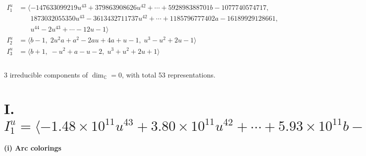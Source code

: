\documentclass[1p]{elsarticle_modified}
\theoremstyle{definition}
\begin{document}
\begin{align*}
I^u_{1}&=\langle 
-147633099219 u^{43}+379863908626 u^{42}+\cdots+592898388701 b-1077740574717,\\
\phantom{I^u_{1}}&\phantom{= \langle  }1873032055350 u^{43}-3613432711737 u^{42}+\cdots+1185796777402 a-16189929128661,\\
\phantom{I^u_{1}}&\phantom{= \langle  }u^{44}-2 u^{43}+\cdots-12 u-1\rangle \\
I^u_{2}&=\langle 
b-1,\;2 u^2 a+a^2-2 a u+4 a+u-1,\;u^3- u^2+2 u-1\rangle \\
I^u_{3}&=\langle 
b+1,\;- u^2+a- u-2,\;u^3+u^2+2 u+1\rangle \\
\\
\end{align*}
\raggedright * 3 irreducible components of $\dim_{\mathbb{C}}=0$, with total 53 representations.\\
\newpage
\renewcommand{\arraystretch}{1}
\centering \section*{I. $I^u_{1}= \langle -1.48\times10^{11} u^{43}+3.80\times10^{11} u^{42}+\cdots+5.93\times10^{11} b-1.08\times10^{12},\;1.87\times10^{12} u^{43}-3.61\times10^{12} u^{42}+\cdots+1.19\times10^{12} a-1.62\times10^{13},\;u^{44}-2 u^{43}+\cdots-12 u-1 \rangle$}
\flushleft \textbf{(i) Arc colorings}\\
\end{document}
